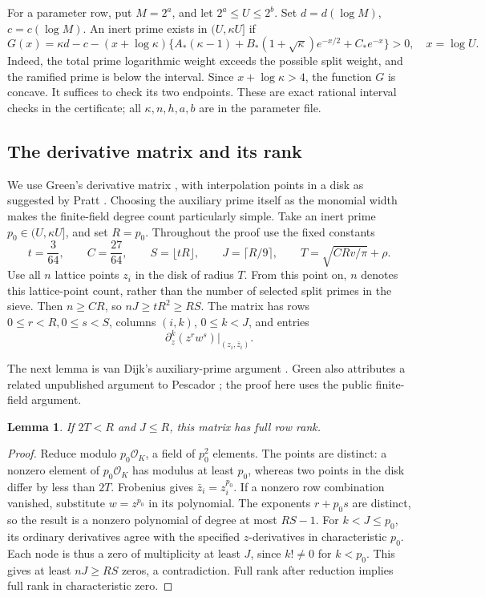 \documentclass[11pt]{article}
\newtheorem{lemma}[theorem]{Lemma}
\newcommand{\OK}{\mathcal O_K}
\begin{document}
For a parameter row, put \(M=2^a\), and let
\(2^a\le U\le2^b\). Set \(d=d(\log M)\), \(c=c(\log M)\).
An inert prime exists in \((U,\kappa U]\) if
\begin{equation}\label{sieve-margin}
 G(x)=\kappa d-c-(x+\log\kappa)
 \{A_*(\kappa-1)+B_*(1+\sqrt\kappa)e^{-x/2}+C_*e^{-x}\}>0,
 \quad x=\log U.
\end{equation}
Indeed, the total prime logarithmic weight exceeds the possible split
weight, and the ramified prime is below the interval. Since
\(x+\log\kappa>4\), the function \(G\) is concave. It suffices to
check its two endpoints. These are exact rational interval checks in
the certificate; all \(\kappa,n,h,a,b\) are in the parameter file.

\subsection{The derivative matrix and its rank}\label{rank}
We use Green's derivative matrix \cite{green}, with interpolation points
in a disk as suggested by Pratt \cite{pratt}. Choosing the auxiliary
prime itself as the monomial width makes the finite-field degree count
particularly simple.
Take an inert prime \(p_0\in(U,\kappa U]\), and set \(R=p_0\).
Throughout the proof use the fixed constants
\begin{equation}\label{fixed}
 t=\frac3{64},\qquad C=\frac{27}{64},\qquad
 S=\lfloor tR\rfloor,\qquad J=\lceil R/9\rceil,
 \qquad T=\sqrt{CRv/\pi}+\rho.
\end{equation}
Use all \(n\) lattice points \(z_i\) in the disk of radius \(T\).
From this point on, \(n\) denotes this lattice-point count, rather
than the number of selected split primes in the sieve.
Then \(n\ge CR\), so \(nJ\ge tR^2\ge RS\).
The matrix has rows \(0\le r<R,0\le s<S\), columns \((i,k)\),
\(0\le k<J\), and entries
\[
 \partial_z^k(z^r w^s)\big|_{(z_i,\bar z_i)}.
\]

The next lemma is van Dijk's auxiliary-prime argument \cite{vandijk}.
Green also attributes a related unpublished argument to Pescador
\cite{greencomment}; the proof here uses the public finite-field argument.

\begin{lemma}\label{nonzero}
If \(2T<R\) and \(J\le R\), this matrix has full row rank.
\end{lemma}
\begin{proof}
Reduce modulo \(p_0\OK\), a field of \(p_0^2\) elements. The points
are distinct: a nonzero element of \(p_0\OK\) has modulus at least
\(p_0\), whereas two points in the disk differ by less than \(2T\).
Frobenius gives \(\bar z_i=z_i^{p_0}\).
If a nonzero row combination vanished, substitute \(w=z^{p_0}\) in
its polynomial. The exponents \(r+p_0s\) are distinct, so the result
is a nonzero polynomial of degree at most \(RS-1\). For \(k<J\le p_0\),
its ordinary derivatives agree with the specified \(z\)-derivatives
in characteristic \(p_0\). Each node is thus a zero of multiplicity
at least \(J\), since \(k!\ne0\) for \(k<p_0\). This gives at least
\(nJ\ge RS\) zeros, a contradiction. Full rank after reduction
implies full rank in characteristic zero.
\end{proof}
\end{document}
